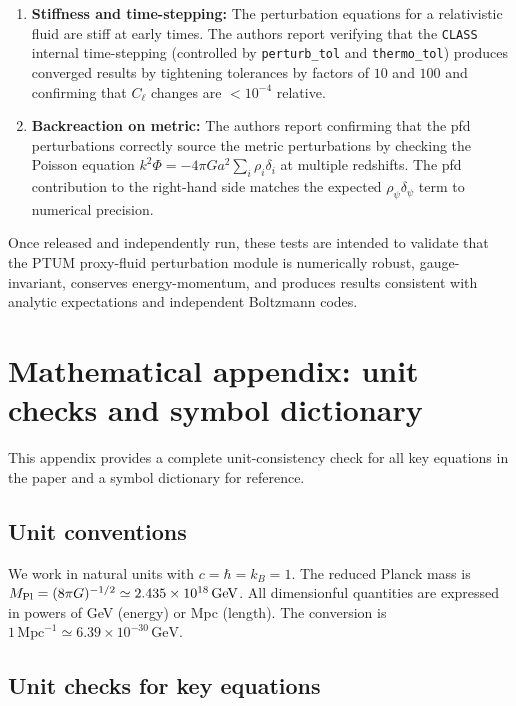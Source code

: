\documentclass[epj]{svjour}
\begin{document}
\begin{enumerate}
\item \textbf{Stiffness and time-stepping:} The perturbation
      equations for a relativistic fluid are stiff at early times.
      The authors report verifying that the \texttt{CLASS} internal
      time-stepping
      (controlled by \texttt{perturb\_tol} and \texttt{thermo\_tol})
      produces converged results by tightening tolerances by factors
      of $10$ and $100$ and confirming that $C_\ell$ changes are
      $<10^{-4}$ relative.

\item \textbf{Backreaction on metric:} The authors report confirming
      that the pfd perturbations correctly source the metric
      perturbations by
      checking the Poisson equation $k^2\Phi = -4\pi G a^2
      \sum_i \rho_i \delta_i$ at multiple redshifts. The pfd
      contribution to the right-hand side matches the expected
      $\rho_\psi \delta_\psi$ term to numerical precision.
\end{enumerate}

Once released and independently run, these tests are intended to
validate that the PTUM proxy-fluid perturbation module is numerically
robust, gauge-invariant, conserves energy-momentum, and produces
results consistent with analytic expectations and independent
Boltzmann codes.

\section{Mathematical appendix: unit checks and symbol dictionary}
\label{app:math}

This appendix provides a complete unit-consistency check for all
key equations in the paper and a symbol dictionary for reference.

\subsection{Unit conventions}

We work in natural units with \(c = \hbar = k_B = 1\). The
reduced Planck mass is \(M_{\rm Pl} = (8\pi G)^{-1/2} \simeq
2.435 \times 10^{18}\,\mathrm{GeV}\). All dimensionful quantities
are expressed in powers of GeV (energy) or Mpc (length). The
conversion is \(1\,\mathrm{Mpc}^{-1} \simeq 6.39 \times 10^{-30}\,
\mathrm{GeV}\).

\subsection{Unit checks for key equations}
\end{document}
